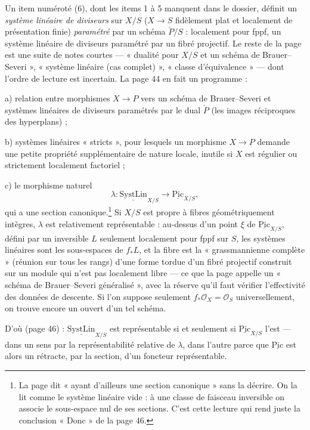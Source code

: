 \documentclass[11pt,a4paper]{article}
\begin{document}
Un item numéroté (6), dont les items 1 à 5 manquent dans le dossier, définit un
\emph{système linéaire de diviseurs} sur $X/S$ ($X \to S$ fidèlement plat et
localement de présentation finie) \emph{paramétré} par un schéma
$\check{P}/S$ : localement pour fppf, un système linéaire de diviseurs
paramétré par un fibré projectif. Le reste de la page est une suite de notes
courtes — « dualité pour $X/S$ et un schéma de Brauer–Severi », « système
linéaire (cas complet) », « classe d'équivalence » — dont l'ordre de lecture
est incertain. La page 44 en fait un programme :

a) relation entre morphismes $X \to P$ vers un schéma de Brauer–Severi et
systèmes linéaires de diviseurs paramétrés par le dual $\check{P}$ (les
images réciproques des hyperplans) ;

b) systèmes linéaires « stricts », pour lesquels un morphisme $X \to P$
demande une petite propriété supplémentaire de nature locale, inutile si $X$
est régulier ou strictement localement factoriel ;

c) le morphisme naturel
\[
\lambda : \underline{\mathrm{SystLin}}_{X/S} \longrightarrow
\underline{\mathrm{Pic}}_{X/S},
\]
qui a une section canonique.\footnote{La page dit « ayant d'ailleurs une
section canonique » sans la décrire. On la lit comme le système linéaire
vide : à une classe de faisceau inversible on associe le sous-espace nul de
ses sections. C'est cette lecture qui rend juste la conclusion « Donc » de la
page 46.} Si $X/S$ est propre à fibres géométriquement intègres, $\lambda$ est
relativement représentable : au-dessus d'un point $\xi$ de
$\underline{\mathrm{Pic}}_{X/S}$, défini par un inversible $L$ seulement
localement pour fppf sur $S$, les systèmes linéaires sont les sous-espaces de
$f_{*}L$, et la fibre est la « grassmannienne complète » (réunion sur tous les
rangs) d'une forme tordue d'un fibré projectif construit sur un module qui
n'est pas localement libre — ce que la page appelle un « schéma de
Brauer–Severi généralisé », avec la réserve qu'il faut vérifier
l'effectivité des données de descente. Si l'on suppose seulement
$f_{*}\mathcal{O}_X = \mathcal{O}_S$ universellement, on trouve encore un
ouvert d'un tel schéma.

D'où (page 46) : $\underline{\mathrm{SystLin}}_{X/S}$ est représentable si et
seulement si $\underline{\mathrm{Pic}}_{X/S}$ l'est — dans un sens par la
représentabilité relative de $\lambda$, dans l'autre parce que
$\underline{\mathrm{Pic}}$ est alors un rétracte, par la section, d'un foncteur
représentable.
\end{document}
